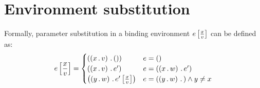 \section{Environment substitution}
\label{env-substitution}

Formally, parameter substitution in a binding environment $e\left[\frac{x}{v}\right]$ can be defined as:
\[
  e \subst{x}{v} =
  \begin{cases}
    \ildpair{\ildpair{x}{v}}{()} & e = () \\
    \ildpair{\ildpair{x}{v}}{e'} & e = \ildpair{\ildpair{x}{w}}{e'} \\
    \ildpair{\ildpair{y}{w}}{e' \subst{x}{v}} & e = \ildpair{\ildpair{y}{w}}{} \land y \neq x
  \end{cases}
\]
